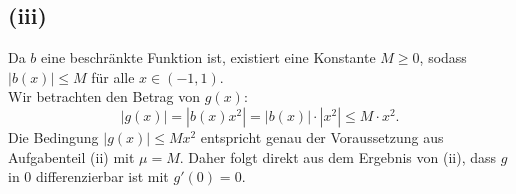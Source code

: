 \documentclass{article}
\begin{document}
\subsection*{(iii)}
Da \(b\) eine beschränkte Funktion ist, existiert eine Konstante \(M \ge 0\), sodass \(|b(x)| \le M\) für alle \(x \in (-1,1)\). \\
Wir betrachten den Betrag von \(g(x)\):
\[|g(x)| = |b(x)x^2| = |b(x)| \cdot |x^2| \le M \cdot x^2.\]
Die Bedingung \(|g(x)| \le M x^2\) entspricht genau der Voraussetzung aus Aufgabenteil (ii) mit \(\mu = M\).
Daher folgt direkt aus dem Ergebnis von (ii), dass \(g\) in 0 differenzierbar ist mit \(g'(0)=0\).
\end{document}
